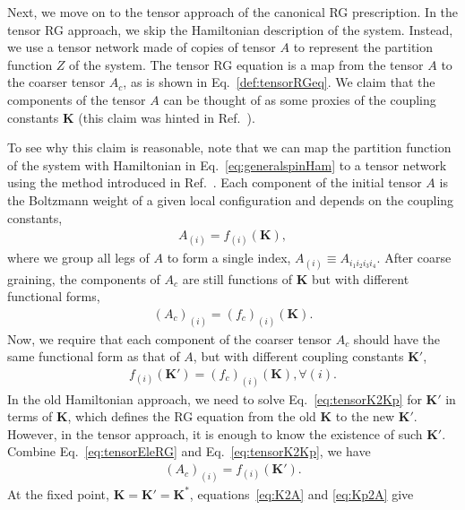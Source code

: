 \documentclass[aps,prr,reprint,superscriptaddress,floatfix]{revtex4-2}
\begin{document}
Next, we move on to the tensor approach of the canonical RG prescription.
In the tensor RG approach, we skip the Hamiltonian description of the system. 
Instead, we use a tensor network made of copies of tensor $A$ to represent the partition function $Z$ of the system. 
The tensor RG equation is a map from the tensor $A$ to the coarser tensor $A_c$, as is shown in Eq.~\eqref{def:tensorRGeq}.
We claim that the components of the tensor $A$ can be thought of as some proxies of the coupling constants $\mathbf{K}$ (this claim was hinted in Ref.~\cite{GuWen2009}).
%

To see why this claim is reasonable, note that we can map the partition function of the system with Hamiltonian in Eq.~\eqref{eq:generalspinHam} to a tensor network using the method introduced in Ref.~\cite{trg}. 
Each component of the initial tensor $A$ is the Boltzmann weight of a given local configuration and depends on the coupling constants,
%
\begin{align}\label{eq:K2A}
    A_{(i)} = f_{(i)}\left(\mathbf{K}\right),
\end{align}
%
where we group all legs of $A$ to form a single index, $A_{(i)}\equiv A_{i_1 i_2 i_3 i_4}$. 
After coarse graining, the components of $A_c$ are still functions of $\mathbf{K}$ but
with different functional forms,
%
\begin{align}\label{eq:tensorEleRG}
    \left(A_c\right)_{(i)} =
\left(f_c\right)_{(i)}\left(\mathbf{K}\right).
\end{align}
%
Now, we require that each component of the coarser tensor $A_c$ should have the same functional form as that of $A$, but with different coupling constants $\mathbf{K}'$,
%
\begin{align}\label{eq:tensorK2Kp}
    f_{(i)}\left(\mathbf{K}'\right) =
    \left(f_c\right)_{(i)}\left(\mathbf{K}\right), \forall (i).
\end{align}
%
In the old Hamiltonian approach, we need to solve Eq.~\eqref{eq:tensorK2Kp} for $\mathbf{K}'$ in terms of $\mathbf{K}$, which defines the RG equation from the old $\mathbf{K}$ to the new $\mathbf{K}'$. 
However, in the tensor approach, it is enough to know the existence of such $\mathbf{K}'$. Combine Eq.~\eqref{eq:tensorEleRG} and Eq.~\eqref{eq:tensorK2Kp}, we have
%
\begin{align}\label{eq:Kp2A}
    \left(A_c\right)_{(i)} = f_{(i)}\left(\mathbf{K}'\right).
\end{align}
%
At the fixed point, $\mathbf{K} = \mathbf{K}' = \mathbf{K}^*$, equations~\eqref{eq:K2A} and \eqref{eq:Kp2A} give
\end{document}
